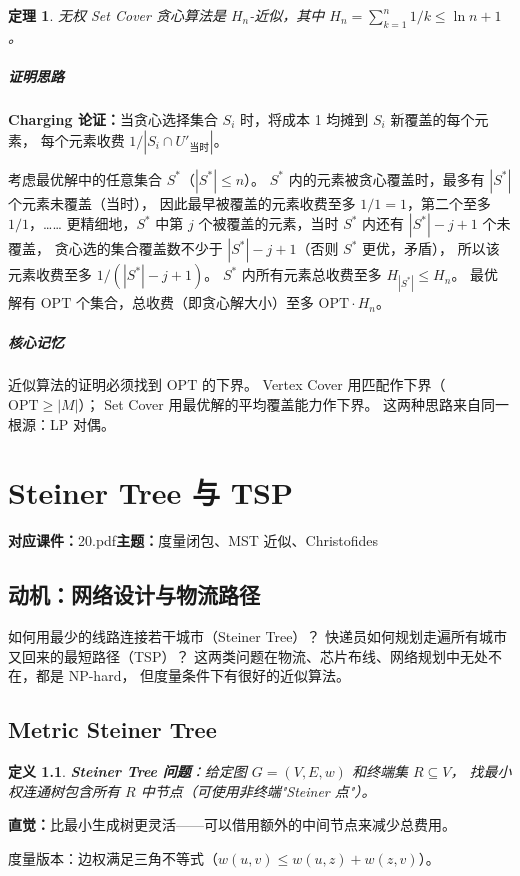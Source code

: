 \documentclass[UTF8,openany,12pt]{ctexbook}
\newtheorem{definition}{定义}[chapter]
\newtheorem{theorem}{定理}[chapter]
\theoremstyle{remark}
\newcommand{\lecture}[3]{
  \chapter{#2}
  \noindent\textbf{对应课件：}#1\hfill\textbf{主题：}#3
  \vspace{0.6em}
}
\newcommand{\keypoint}[1]{\paragraph{核心记忆}#1}
\newcommand{\proofidea}[1]{\paragraph{证明思路}#1}
\newcommand{\OPT}{\mathrm{OPT}}
\begin{document}
\begin{theorem}
无权 Set Cover 贪心算法是 $H_n$-近似，其中 $H_n = \sum_{k=1}^{n} 1/k \le \ln n + 1$。
\end{theorem}

\proofidea{
\textbf{Charging 论证：}当贪心选择集合 $S_i$ 时，将成本 1 均摊到 $S_i$ 新覆盖的每个元素，
每个元素收费 $1/|S_i \cap U'_{\text{当时}}|$。

考虑最优解中的任意集合 $S^*$（$|S^*| \le n$）。
$S^*$ 内的元素被贪心覆盖时，最多有 $|S^*|$ 个元素未覆盖（当时），
因此最早被覆盖的元素收费至多 $1/1 = 1$，第二个至多 $1/1$，……
更精细地，$S^*$ 中第 $j$ 个被覆盖的元素，当时 $S^*$ 内还有 $|S^*|-j+1$ 个未覆盖，
贪心选的集合覆盖数不少于 $|S^*|-j+1$（否则 $S^*$ 更优，矛盾），
所以该元素收费至多 $1/(|S^*|-j+1)$。
$S^*$ 内所有元素总收费至多 $H_{|S^*|} \le H_n$。
最优解有 $\OPT$ 个集合，总收费（即贪心解大小）至多 $\OPT \cdot H_n$。
}

\keypoint{
  近似算法的证明必须找到 $\OPT$ 的下界。
  Vertex Cover 用匹配作下界（$\OPT \ge |M|$）；
  Set Cover 用最优解的平均覆盖能力作下界。
  这两种思路来自同一根源：LP 对偶。
}

\lecture{20.pdf}{Steiner Tree 与 TSP}{度量闭包、MST 近似、Christofides}

\section*{动机：网络设计与物流路径}

如何用最少的线路连接若干城市（Steiner Tree）？
快递员如何规划走遍所有城市又回来的最短路径（TSP）？
这两类问题在物流、芯片布线、网络规划中无处不在，都是 NP-hard，
但度量条件下有很好的近似算法。

\section{Metric Steiner Tree}

\begin{definition}
\textbf{Steiner Tree 问题}：给定图 $G=(V,E,w)$ 和终端集 $R \subseteq V$，
找最小权连通树包含所有 $R$ 中节点（可使用非终端"Steiner 点"）。
\end{definition}

\textbf{直觉：}比最小生成树更灵活——可以借用额外的中间节点来减少总费用。

度量版本：边权满足三角不等式（$w(u,v) \le w(u,z)+w(z,v)$）。
\end{document}
